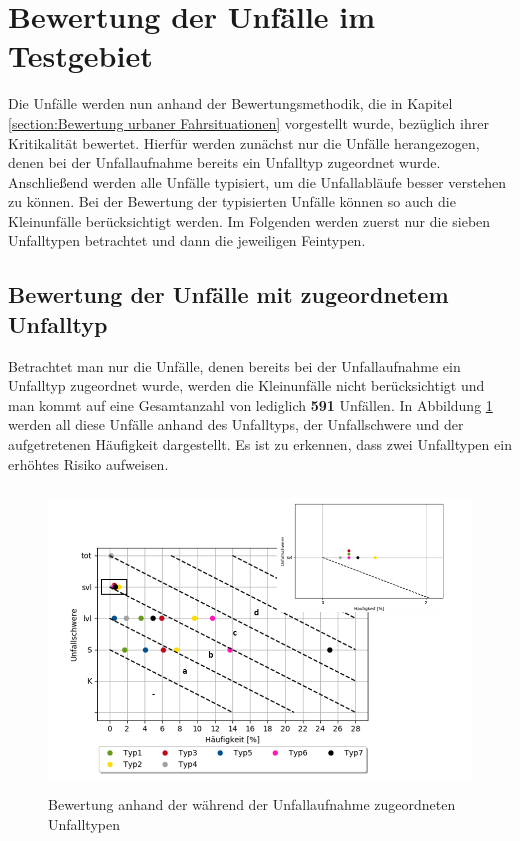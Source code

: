 
\section{Bewertung der Unfälle im Testgebiet}\label{section:Bewertung der Unfälle im Testgebiet}
Die Unfälle werden nun anhand der Bewertungsmethodik, die in Kapitel \ref{section:Bewertung urbaner Fahrsituationen} vorgestellt wurde, bezüglich ihrer Kritikalität bewertet. Hierfür werden zunächst nur die Unfälle herangezogen, denen bei der Unfallaufnahme bereits ein Unfalltyp zugeordnet wurde. Anschließend werden alle Unfälle typisiert, um die Unfallabläufe besser verstehen zu können. Bei der Bewertung der typisierten Unfälle können so auch die Kleinunfälle berücksichtigt werden. Im Folgenden werden zuerst nur die sieben Unfalltypen betrachtet und dann die jeweiligen Feintypen.

\subsection{Bewertung der Unfälle mit zugeordnetem Unfalltyp}
Betrachtet man nur die Unfälle, denen bereits bei der Unfallaufnahme ein Unfalltyp zugeordnet wurde, werden die Kleinunfälle nicht berücksichtigt und man kommt auf eine Gesamtanzahl von lediglich \textbf{591} Unfällen. In Abbildung \ref{fig:Bewertung_UT} werden all diese Unfälle anhand des Unfalltyps, der Unfallschwere und der aufgetretenen Häufigkeit dargestellt. Es ist zu erkennen, dass zwei Unfalltypen ein erhöhtes Risiko aufweisen.

\begin{savenotes}
	\begin{figure}[H]
		\centering
		\includegraphics[width=12cm,height=8cm]{figures/Bewertung_UT}
		\caption[Bewertung anhand der während der Unfallaufnahme zugeordneten Unfalltypen]{Bewertung anhand der während der Unfallaufnahme zugeordneten Unfalltypen}\label{fig:Bewertung_UT}
	\end{figure}
\end{savenotes}

